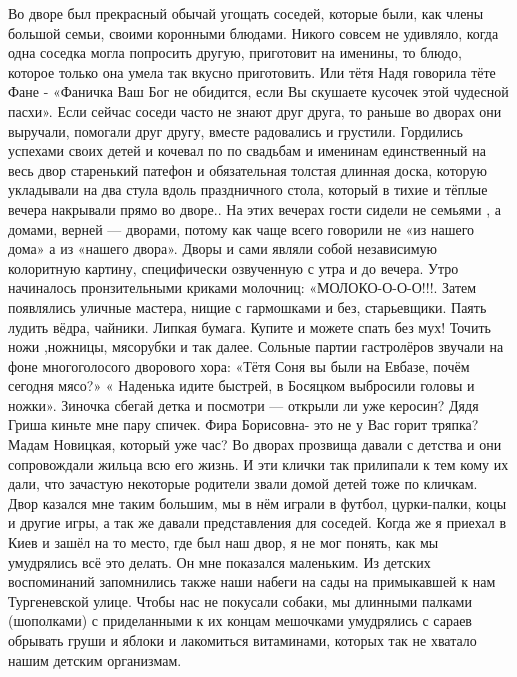 Во дворе был прекрасный обычай угощать соседей, которые были, как члены
большой семьи, своими коронными блюдами. Никого совсем не удивляло, когда одна
соседка могла попросить другую, приготовит на именины, то блюдо, которое
только она умела так вкусно приготовить. Или тётя Надя говорила тёте Фане
-  «Фаничка Ваш Бог не обидится, если Вы скушаете кусочек этой чудесной пасхи».
Если сейчас соседи часто не знают друг друга, то раньше во дворах они выручали,
помогали друг другу, вместе радовались и грустили.  Гордились успехами  своих
детей и кочевал по по свадьбам и именинам единственный на весь двор старенький
патефон и обязательная толстая длинная доска, которую укладывали на два стула
вдоль праздничного стола, который в тихие и тёплые вечера накрывали прямо во
дворе.. На этих вечерах гости сидели не семьями , а домами, верней — дворами,
потому как чаще всего говорили не «из нашего дома» а из «нашего двора». Дворы и
сами являли собой независимую колоритную картину, специфически озвученную с
утра и до вечера. Утро начиналось пронзительными криками молочниц:
«МОЛОКО-О-О-О!!!. Затем появлялись уличные мастера, нищие с гармошками и без,
старьевщики. Паять лудить вёдра, чайники. Липкая бумага. Купите и можете спать
без мух! Точить ножи ,ножницы, мясорубки и так далее. Сольные партии
гастролёров звучали на фоне многоголосого дворового хора: «Тётя Соня вы были
на Евбазе, почём сегодня мясо?» « Наденька  идите быстрей, в Босяцком выбросили
головы и ножки». Зиночка сбегай детка и посмотри — открыли ли уже керосин?
Дядя Гриша киньте мне пару спичек. Фира Борисовна- это не у Вас горит тряпка?
Мадам Новицкая, который уже час? Во дворах прозвища давали  с детства и они
сопровождали жильца всю его жизнь. И эти клички так прилипали к тем кому их
дали, что зачастую  некоторые родители   звали  домой детей тоже по кличкам.
Двор казался мне таким большим, мы в нём играли в футбол, цурки-палки, коцы и
другие игры,  а так же давали представления для соседей. Когда же я приехал в
Киев и зашёл на то место, где  был наш двор, я не мог понять, как мы
умудрялись всё это делать. Он мне показался маленьким. Из детских воспоминаний
запомнились также наши набеги на сады на примыкавшей к нам Тургеневской улице.
Чтобы нас не покусали собаки, мы длинными палками (шополками) с приделанными к
их концам мешочками умудрялись с сараев  обрывать груши и яблоки  и лакомиться
витаминами, которых так не хватало нашим детским организмам.

